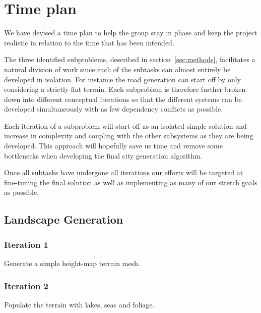 \section{Time plan}

We have devised a time plan to help the group stay in phase and keep the project realistic in relation to the time that has been intended.

The three identified subproblems, described in section~\ref{sec:methods}, facilitates a natural division of work since each of the subtasks can almost entirely be developed in isolation.
For instance the road generation can start off by only considering a strictly flat terrain.
Each subproblem is therefore further broken down into different conceptual iterations so that the different systems can be developed simultaneously with as few dependency conflicts as possible.

Each iteration of a subproblem will start off as an isolated simple solution and increase in complexity and coupling with the other subsystems as they are being developed.
This approach will hopefully save us time and remove some bottlenecks when developing the final city generation algorithm.

Once all subtasks have undergone all iterations our efforts will be targeted at fine-tuning the final solution as well as implementing as many of our stretch goals as possible.

\subsection{Landscape Generation}
\subsubsection{Iteration 1}
Generate a simple height-map terrain mesh.

\subsubsection{Iteration 2}
Populate the terrain with lakes, seas and foliage.

